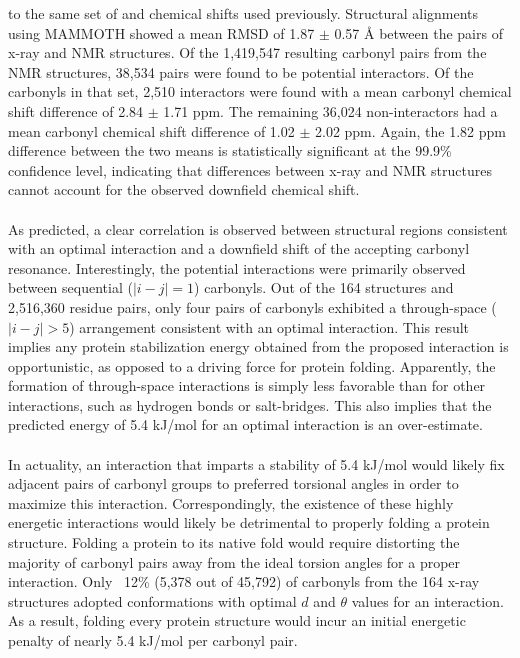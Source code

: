\begin{doublespace}
to the same set of \cnmr{} and \nnmr{} chemical shifts used previously.
Structural alignments using MAMMOTH showed a mean RMSD of 1.87 $\pm$ 0.57 \r{A}
between the pairs of x-ray and NMR structures. Of the 1,419,547 resulting
carbonyl pairs from the NMR structures, 38,534 pairs were found to be potential
interactors. Of the carbonyls in that set, 2,510 interactors were found with a
mean carbonyl \cnmr{} chemical shift difference of 2.84 $\pm$ 1.71 ppm. The
remaining 36,024 non-interactors had a mean carbonyl \cnmr{} chemical shift
difference of 1.02 $\pm$ 2.02 ppm. Again, the 1.82 ppm difference between the
two means is statistically significant at the 99.9\% confidence level, 
indicating that differences between x-ray and NMR structures cannot account
for the observed downfield \cnmr{} chemical shift.
\\\\
As predicted, a clear correlation is observed between structural regions
consistent with an optimal \npistar{} interaction and a downfield shift of the
accepting carbonyl \cnmr{} resonance. Interestingly, the potential \npistar{}
interactions were primarily observed between sequential ($|i-j|=1$) carbonyls.
Out of the 164 structures and 2,516,360 residue pairs, only four pairs of
carbonyls exhibited a through-space ($|i-j| > 5$) arrangement consistent with
an optimal \npistar{} interaction. This result implies any protein
stabilization energy obtained from the proposed \npistar{} interaction is
opportunistic, as opposed to a driving force for protein folding. Apparently,
the formation of through-space \npistar{} interactions is simply less favorable
than for other interactions, such as hydrogen bonds or salt-bridges. This also
implies that the predicted energy of 5.4 kJ/mol for an optimal \npistar{}
interaction is an over-estimate.
\\\\
In actuality, an \npistar{} interaction that imparts a stability of 5.4 kJ/mol
would likely fix adjacent pairs of carbonyl groups to preferred torsional
angles in order to maximize this interaction. Correspondingly, the existence
of these highly energetic \npistar{} interactions would likely be detrimental
to properly folding a protein structure. Folding a protein to its native fold
would require distorting the majority of carbonyl pairs away from the ideal
torsion angles for a proper \npistar{} interaction. Only ~12\% (5,378 out of
45,792) of carbonyls from the 164 x-ray structures adopted conformations with
optimal $d$ and $\theta$ values for an \npistar{} interaction. As a result,
folding every protein structure would incur an initial energetic penalty of
nearly 5.4 kJ/mol per carbonyl pair.
\end{doublespace}

